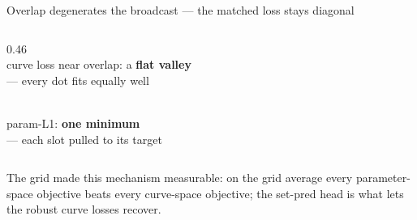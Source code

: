 \begin{frame}{Overlap degenerates the broadcast --- the matched loss stays diagonal}
\begin{columns}[T]
\begin{column}{0.46\textwidth}
{        \\[8pt]
        {\tiny curve loss near overlap: a \textcolor{accent}{\textbf{flat valley}}\\
         --- every dot fits equally well}}
      \hfill
      \parbox[t]{0.48\linewidth}{\centering
        \\[8pt]
        {\tiny param-L1: \textcolor{good}{\textbf{one minimum}}\\
         --- each slot pulled to its target}}
    \end{column}
  \end{columns}
  \vspace{8pt}
  {\scriptsize\color{accent} The grid made this mechanism measurable: on the grid
  average every parameter-space objective beats every curve-space objective; the
  set-pred head is what lets the robust curve losses recover.\par}
\end{frame}

